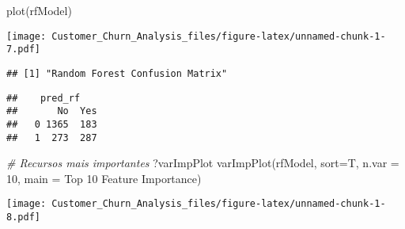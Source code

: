 \documentclass[
]{article}
\newenvironment{Shaded}{\begin{snugshade}}{\end{snugshade}}
\newcommand{\AttributeTok}[1]{\textcolor[rgb]{0.77,0.63,0.00}{#1}}
\newcommand{\CommentTok}[1]{\textcolor[rgb]{0.56,0.35,0.01}{\textit{#1}}}
\newcommand{\DecValTok}[1]{\textcolor[rgb]{0.00,0.00,0.81}{#1}}
\newcommand{\FunctionTok}[1]{\textcolor[rgb]{0.00,0.00,0.00}{#1}}
\newcommand{\NormalTok}[1]{#1}
\newcommand{\OtherTok}[1]{\textcolor[rgb]{0.56,0.35,0.01}{#1}}
\newcommand{\SpecialCharTok}[1]{\textcolor[rgb]{0.00,0.00,0.00}{#1}}
\newcommand{\StringTok}[1]{\textcolor[rgb]{0.31,0.60,0.02}{#1}}
\begin{document}
\begin{Shaded}
\begin{Highlighting}[]
\FunctionTok{plot}\NormalTok{(rfModel)}
\end{Highlighting}
\end{Shaded}

\texttt{[image: Customer\_Churn\_Analysis\_files/figure-latex/unnamed-chunk-1-7.pdf]}

\begin{Shaded}
\end{Shaded}

\begin{verbatim}
## [1] "Random Forest Confusion Matrix"
\end{verbatim}

\begin{verbatim}
##    pred_rf
##       No  Yes
##   0 1365  183
##   1  273  287
\end{verbatim}

\begin{Shaded}
\begin{Highlighting}[]
\CommentTok{\# Recursos mais importantes}
\NormalTok{?varImpPlot}
\FunctionTok{varImpPlot}\NormalTok{(rfModel, }\AttributeTok{sort=}\NormalTok{T, }\AttributeTok{n.var =} \DecValTok{10}\NormalTok{, }\AttributeTok{main =} \StringTok{\textquotesingle{}Top 10 Feature Importance\textquotesingle{}}\NormalTok{)}
\end{Highlighting}
\end{Shaded}

\texttt{[image: Customer\_Churn\_Analysis\_files/figure-latex/unnamed-chunk-1-8.pdf]}
\end{document}
